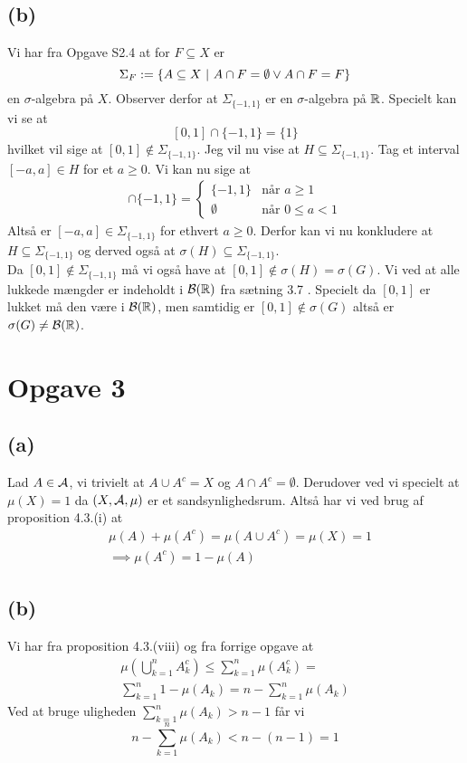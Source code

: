 \documentclass{article}
\begin{document}
\subsection*{(b)}
Vi har fra Opgave S2.4 at for $F \subseteq X$ er 
\[
    \Sigma_{F} := \{A \subseteq X \text{ } | \text{ } A \cap F = \emptyset \lor A \cap F = F \}
\]
en $\sigma$-algebra på $X$.
Observer derfor at $\Sigma_{\{-1,1\}}$ er en $\sigma$-algebra på $\mathbb{R}$.
Specielt kan vi se at
\[
    [0,1] \cap \{-1,1\} = \{1\}
\]
hvilket vil sige at $[0,1] \notin \Sigma_{\{-1,1\}}$.
Jeg vil nu vise at $H \subseteq \Sigma_{\{-1,1\}}$. Tag et interval 
$[-a,a] \in H$ for et $a \ge 0$. Vi kan nu sige at
\begin{align*}
    [-a,a] \cap \{-1,1\} =
    \begin{cases}
        \{-1,1\} & \text{når } a \ge 1 \\
        \emptyset & \text{når } 0 \le a < 1
    \end{cases}
\end{align*}
Altså er $[-a,a] \in \Sigma_{\{-1,1\}}$ for ethvert $a \ge 0$.
Derfor kan vi nu konkludere at $H \subseteq \Sigma_{\{-1,1\}}$ og derved også at 
$\sigma(H) \subseteq \Sigma_{\{-1,1\}}$. \\
Da
$[0,1] \notin \Sigma_{\{-1,1\}}$ må vi også have at $[0,1] \notin \sigma(H) = \sigma(G)$.
Vi ved at alle lukkede mængder er indeholdt i $\mathcal{B}(\mathbb{R})$
fra sætning 3.7 \cite{lim}.
Specielt da $[0,1]$ er lukket må den være i $\mathcal{B}(\mathbb{R})$, 
men samtidig er $[0,1] \notin \sigma(G)$ altså er
$\sigma(G) \neq \mathcal{B}(\mathbb{R})$.


\section*{Opgave 3}
\subsection*{(a)}
Lad $A \in \mathcal{A}$, vi trivielt at $A \cup A^{c} = X$ og $A \cap A^{c} = \emptyset$.
Derudover ved vi specielt at $\mu(X) = 1$ da $(X, \mathcal{A}, \mu)$ er et sandsynlighedsrum.
Altså har vi ved brug af proposition 4.3.(i) \cite{lim} at
\begin{align*}
    &\mu(A) + \mu(A^{c}) = \mu(A \cup A^{c}) = \mu(X) = 1 \\
    &\implies \mu(A^{c}) = 1 - \mu(A)
\end{align*}
\subsection*{(b)}
Vi har fra proposition 4.3.(viii) og fra forrige opgave at
\begin{align*}
    \mu(\bigcup_{k = 1}^n A_k^{c}) \le \sum_{k=1}^n \mu(A_k^{c}) = \\
     \sum_{k=1}^n 1 - \mu(A_k) = n - \sum_{k=1}^n \mu(A_k)
\end{align*}
Ved at bruge uligheden $\sum_{k=1}^n \mu(A_k) > n - 1$ får vi
\[
    n - \sum_{k=1}^n \mu(A_k) < n - (n-1) = 1
\]
\end{document}
